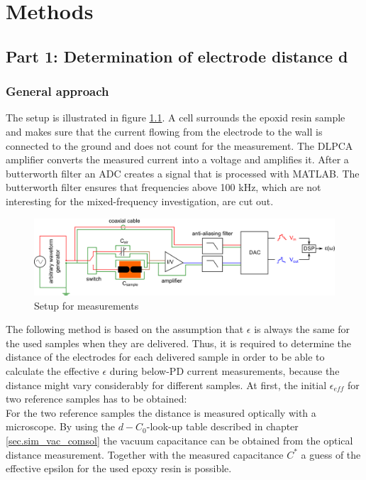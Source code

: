 \chapter{Methods}
\section{Part 1: Determination of electrode distance d}
\label{part1}
\subsection{General approach}
The setup is illustrated in figure \ref{sec.setup_amp_1}. A cell surrounds the  epoxid resin sample and makes sure that the current flowing from the electrode to the wall is connected to the ground and does not count for the measurement. The DLPCA amplifier converts the measured current into a voltage and amplifies it. After a butterworth filter an ADC creates a signal that is processed with MATLAB. The butterworth filter ensures that frequencies above 100 kHz, which are not interesting for the mixed-frequency investigation, are cut out. 

\begin{figure}[htbp]
	\centering
	\includegraphics[width=\textwidth]{figures/Method/setup/setup_amplifier.png}		
	\caption[Kurze Abbildungsbeschreibung]{Setup for measurements\protect\footnotemark} 
	\label{sec.setup_amp_1}

\end{figure}

\label{sec:general_approach}
The following method is based on the assumption that  $\epsilon$ is always the same for the used samples when they are delivered. Thus, it is required to determine the distance of the electrodes for each delivered sample in order to be able to calculate the effective $\epsilon$ during below-PD current measurements, because the distance might vary considerably for different samples. 
At first, the initial $\epsilon_{eff}$ for two reference samples has to be obtained:\\
For the two reference samples the distance is measured optically with a microscope. By using the $d-C_0$-look-up table described in  chapter \ref{sec.sim_vac_comsol} the vacuum capacitance can be obtained from the optical distance measurement. Together with the measured capacitance $C^*$ a guess of the effective epsilon for the used epoxy resin is possible. 

